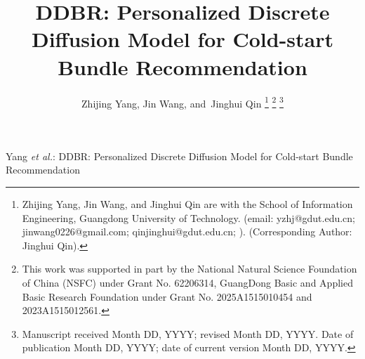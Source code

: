 \documentclass[lettersize,journal]{IEEEtran}
\begin{document}
\title{DDBR: Personalized Discrete Diffusion Model for Cold-start Bundle Recommendation}

\author{Zhijing Yang,
        Jin Wang,
        and~Jinghui Qin         
\thanks{
Zhijing Yang, Jin Wang, and Jinghui Qin are with the School of Information Engineering, Guangdong University of Technology. (email:  yzhj@gdut.edu.cn; jinwang0226@gmail.com; qinjinghui@gdut.edu.cn; ). (Corresponding Author: Jinghui Qin).} 
\thanks{This work was supported in part by the National Natural Science Foundation of China (NSFC) under Grant No. 62206314, GuangDong Basic and Applied Basic Research Foundation under Grant No. 2025A1515010454 and 2023A1515012561.}%
\thanks{Manuscript received Month DD, YYYY; revised Month DD, YYYY. Date of publication Month DD, YYYY; date of current version Month DD, YYYY.}}

%
{Yang \MakeLowercase{\textit{et al.}}: DDBR: Personalized Discrete Diffusion Model for Cold-start Bundle Recommendation}


\maketitle
\end{document}
